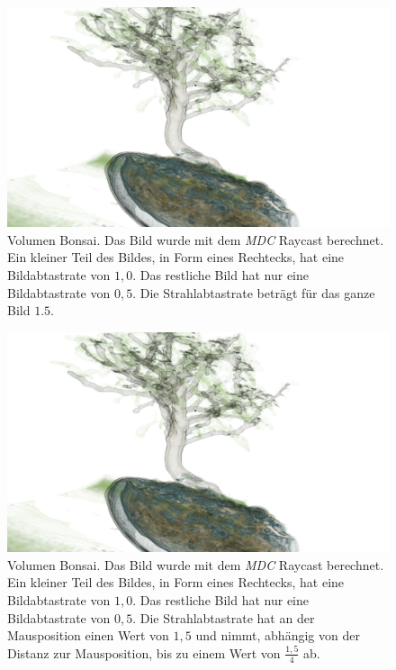 \begin{landscape}
	\begin{figure}
		\centering
		\includegraphics[width=1\textheight]{../../Neue_Messungen/Bonsai/mdc.png}
		\caption{Volumen Bonsai. Das Bild wurde mit dem \emph{MDC} Raycast berechnet. Ein kleiner Teil des Bildes, in Form eines Rechtecks, hat eine Bildabtastrate von $1,0$. Das restliche Bild hat nur eine Bildabtastrate von $0,5$. Die Strahlabtastrate beträgt für das ganze Bild $1.5$.}
		\label{fig::res::bon_mdc}
	\end{figure}
\end{landscape}

\begin{landscape}
	\begin{figure}
		\centering
		\includegraphics[width=1\textheight]{../../Neue_Messungen/Bonsai/mdc_ors.png}
		\caption{Volumen Bonsai. Das Bild wurde mit dem \emph{MDC} Raycast berechnet. Ein kleiner Teil des Bildes, in Form eines Rechtecks, hat eine Bildabtastrate von $1,0$. Das restliche Bild hat nur eine Bildabtastrate von $0,5$. Die Strahlabtastrate hat an der Mausposition einen Wert von $1,5$ und nimmt, abhängig von der Distanz zur Mausposition, bis zu einem Wert von $\frac{1,5}{4}$ ab.}
		\label{fig::res::bon_mdc_ors}
	\end{figure}
\end{landscape}

